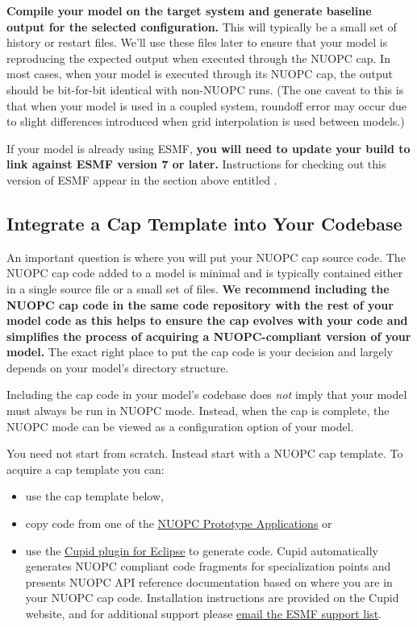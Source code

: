\textbf{Compile your model on the target system and generate baseline output for the
selected configuration.}   This will typically be a small set of history or restart
files.  We'll use these files later to ensure that your model is reproducing the
expected output when executed through the NUOPC cap.  In most cases, when
your model is executed through its NUOPC cap, the output should be bit-for-bit
identical with non-NUOPC runs.  (The one caveat to this is that when your
model is used in a coupled system, roundoff error may occur due to slight
differences introduced when grid interpolation is used between models.)

If your model is already using ESMF, \textbf{you will need to
update your build to link against ESMF version 7 or later.}  Instructions for checking out this version of ESMF
appear in the section above entitled .


\subsection{Integrate a Cap Template into Your Codebase}
\label{sec:integratecap}
An important question is where you will put your NUOPC cap source code.
The NUOPC cap code added to a model is minimal and is typically
contained either in a single source file or a small set of files.  \textbf{We recommend
including the NUOPC cap code in the same code repository with the rest of your
model code as this helps to ensure the cap evolves with your code and simplifies
the process of acquiring a NUOPC-compliant version of your model.}
The exact right place to put the cap code is your decision and largely depends
on your model's directory structure.

Including the cap code in your model's codebase does \emph{not} imply that your
model must always be run in NUOPC mode.  Instead, when the cap is complete,
the NUOPC mode can be viewed as a configuration option of your model.

You need not start from scratch.  Instead start with a NUOPC cap template.
To acquire a cap template you can:
\begin{itemize}
\item use the cap template below,

\item copy code from one of the \href{https://sourceforge.net/p/esmfcontrib/svn/HEAD/tree/NUOPC/tags/ESMF\_7\_0\_0}{NUOPC Prototype Applications} or

\item use the \href{https://www.earthsystemcog.org/projects/cupid/}{Cupid plugin for Eclipse}
to generate code.  Cupid automatically generates NUOPC compliant
code fragments for specialization points and presents NUOPC API reference
documentation based on where you are in your NUOPC cap code.
Installation instructions are provided on the Cupid website, and for additional support please
\href{mailto:esmf\_support@list.woc.noaa.gov}{email the ESMF support list}.

\end{itemize}

